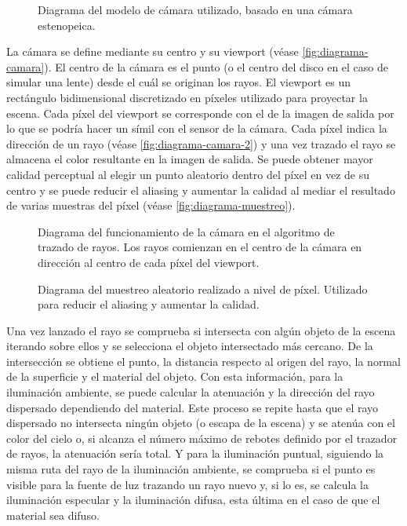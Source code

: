 \documentclass[10pt, a4paper]{article}
\begin{document}
\begin{figure}[H]
    \centering 
    
    \caption{Diagrama del modelo de cámara utilizado, basado en una cámara estenopeica.}
    \label{fig:diagrama-camara}
\end{figure}

La cámara se define mediante su centro y su viewport (véase \autoref{fig:diagrama-camara}). El centro de la cámara es el punto (o el centro del disco en el caso de simular una lente) desde el cuál se originan los rayos. El viewport es un rectángulo bidimensional discretizado en píxeles utilizado para proyectar la escena. Cada píxel del viewport se corresponde con el de la imagen de salida por lo que se podría hacer un símil con el sensor de la cámara. Cada píxel indica la dirección de un rayo (véase \autoref{fig:diagrama-camara-2}) y una vez trazado el rayo se almacena el color resultante en la imagen de salida. Se puede obtener mayor calidad perceptual al elegir un punto aleatorio dentro del píxel en vez de su centro y se puede reducir el aliasing y aumentar la calidad al mediar el resultado de varias muestras del píxel (véase \autoref{fig:diagrama-muestreo}).

\begin{figure}[H]
    \centering 
    
    \caption{Diagrama del funcionamiento de la cámara en el algoritmo de trazado de rayos. Los rayos comienzan en el centro de la cámara en dirección al centro de cada píxel del viewport.}
    \label{fig:diagrama-camara-2}
\end{figure}

\begin{figure}[H]
    \centering 
    
    \caption{Diagrama del muestreo aleatorio realizado a nivel de píxel. Utilizado para reducir el aliasing y aumentar la calidad.}
    \label{fig:diagrama-muestreo}
\end{figure}

Una vez lanzado el rayo se comprueba si intersecta con algún objeto de la escena iterando sobre ellos y se selecciona el objeto intersectado más cercano. De la intersección se obtiene el punto, la distancia respecto al origen del rayo, la normal de la superficie y el material del objeto. Con esta información, para la iluminación ambiente, se puede calcular la atenuación y la dirección del rayo dispersado dependiendo del material. Este proceso se repite hasta que el rayo dispersado no intersecta ningún objeto (o escapa de la escena) y se atenúa con el color del cielo o, si alcanza el número máximo de rebotes definido por el trazador de rayos, la atenuación sería total. Y para la iluminación puntual, siguiendo la misma ruta del rayo de la iluminación ambiente, se comprueba si el punto es visible para la fuente de luz trazando un rayo nuevo y, si lo es, se calcula la iluminación especular y la iluminación difusa, esta última en el caso de que el material sea difuso. 
\end{document}
